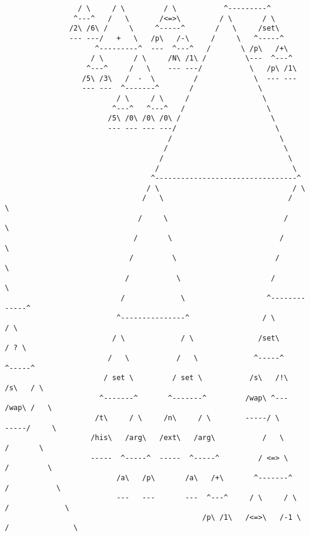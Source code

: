 \documentclass[aip,jcp,reprint,footinbib]{revtex4-1}
\begin{document}
\begin{lstlisting}
                 / \     / \         / \           ^---------^
                ^---^   /   \       /<=>\         / \       / \
               /2\ /6\ /     \     ^-----^       /   \     /set\
               --- ---/   +   \   /p\   /-\     /     \   ^-----^
                     ^---------^  ---  ^---^   /       \ /p\   /+\
                    / \       / \     /N\ /1\ /         \---  ^---^
                   ^---^     /   \    --- ---/           \   /p\ /1\
                  /5\ /3\   /  -  \         /             \  --- ---
                  --- ---  ^-------^       /               \
                          / \     / \     /                 \
                         ^---^   ^---^   /                   \
                        /5\ /0\ /0\ /0\ /                     \
                        --- --- --- ---/                       \
                                      /                         \
                                     /                           \
                                    /                             \
                                   /                               \
                                  ^---------------------------------^
                                 / \                               / \
                                /   \                             /   \
                               /     \                           /     \
                              /       \                         /       \
                             /         \                       /         \
                            /           \                     /           \
                           /             \                   ^-------------^
                          ^---------------^                 / \           / \
                         / \             / \               /set\         / ? \
                        /   \           /   \             ^-----^       ^-----^
                       / set \         / set \           /s\   /!\     /s\   / \
                      ^-------^       ^-------^         /wap\ ^---    /wap\ /   \
                     /t\     / \     /n\     / \        -----/ \      -----/     \
                    /his\   /arg\   /ext\   /arg\           /   \         /       \
                    -----  ^-----^  -----  ^-----^         / <=> \       /         \
                          /a\   /p\       /a\   /+\       ^-------^     /           \
                          ---   ---       ---  ^---^     / \     / \   /             \
                                              /p\ /1\   /<=>\   /-1 \ /               \

\end{lstlisting}
\end{document}
